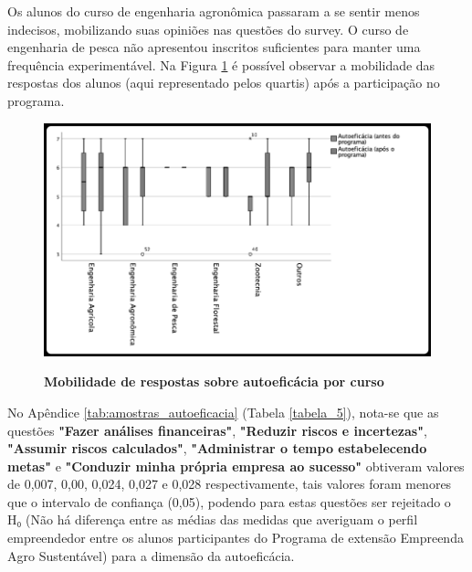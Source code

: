 Os alunos do curso de engenharia agronômica passaram a se sentir menos indecisos, mobilizando suas opiniões nas questões do survey. O curso de engenharia de pesca não apresentou inscritos suficientes para manter uma frequência experimentável. Na Figura \ref{figura_34} é possível observar a mobilidade das respostas dos alunos (aqui representado pelos quartis) após a participação no programa.

\begin{figure}[H]
\centering
\caption{\textbf{Mobilidade de respostas sobre autoeficácia por curso}}
\includegraphics[scale=0.4]{Imagens/boxplot_autoeficacia.png}
\label{figura_34}
\end{figure}


No Apêndice \ref{tab:amostras_autoeficacia} (Tabela \ref{tabela_5}), nota-se que as questões \textbf{"Fazer análises financeiras"}, \textbf{"Reduzir riscos e incertezas"}, \textbf{"Assumir riscos calculados"}, \textbf{"Administrar o tempo estabelecendo metas"} e \textbf{"Conduzir minha própria empresa ao sucesso"} obtiveram valores de 0,007, 0,00, 0,024, 0,027 e 0,028 respectivamente, tais valores foram menores que o intervalo de confiança (0,05), podendo para estas questões ser rejeitado o H₀ (Não há diferença entre as médias das medidas que averiguam o perfil empreendedor entre os alunos participantes do Programa de extensão Empreenda Agro Sustentável) para a dimensão da autoeficácia.

